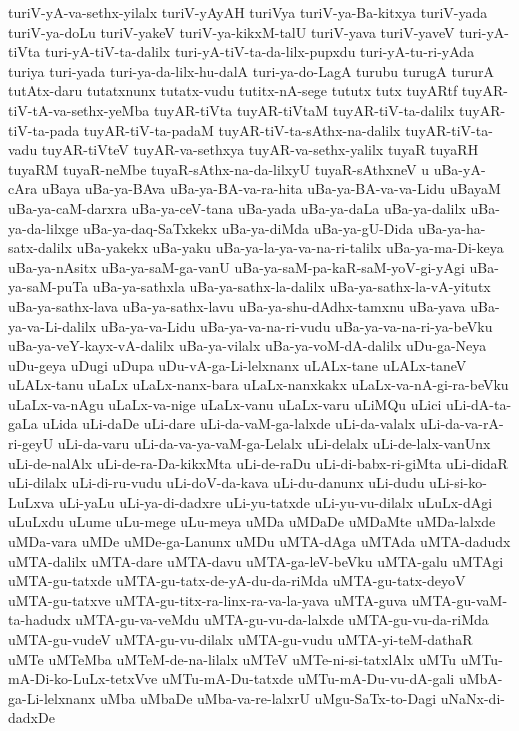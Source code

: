 {turiV-yA-va-sethx-yilalx
turiV-yAyAH
turiVya
turiV-ya-Ba-kitxya
turiV-yada
turiV-ya-doLu
turiV-yakeV
turiV-ya-kikxM-talU
turiV-yava
turiV-yaveV
turi-yA-tiVta
turi-yA-tiV-ta-dalilx
turi-yA-tiV-ta-da-lilx-pupxdu
turi-yA-tu-ri-yAda
turiya
turi-yada
turi-ya-da-lilx-hu-dalA
turi-ya-do-LagA
turubu
turugA
tururA
tutAtx-daru
tutatxnunx
tutatx-vudu
tutitx-nA-sege
tututx
tutx
tuyARtf
tuyAR-tiV-tA-va-sethx-yeMba
tuyAR-tiVta
tuyAR-tiVtaM
tuyAR-tiV-ta-dalilx
tuyAR-tiV-ta-pada
tuyAR-tiV-ta-padaM
tuyAR-tiV-ta-sAthx-na-dalilx
tuyAR-tiV-ta-vadu
tuyAR-tiVteV
tuyAR-va-sethxya
tuyAR-va-sethx-yalilx
tuyaR
tuyaRH
tuyaRM
tuyaR-neMbe
tuyaR-sAthx-na-da-lilxyU
tuyaR-sAthxneV
u
uBa-yA-cAra
uBaya
uBa-ya-BAva
uBa-ya-BA-va-ra-hita
uBa-ya-BA-va-va-Lidu
uBayaM
uBa-ya-caM-darxra
uBa-ya-ceV-tana
uBa-yada
uBa-ya-daLa
uBa-ya-dalilx
uBa-ya-da-lilxge
uBa-ya-daq-SaTxkekx
uBa-ya-diMda
uBa-ya-gU-Dida
uBa-ya-ha-satx-dalilx
uBa-yakekx
uBa-yaku
uBa-ya-la-ya-va-na-ri-talilx
uBa-ya-ma-Di-keya
uBa-ya-nAsitx
uBa-ya-saM-ga-vanU
uBa-ya-saM-pa-kaR-saM-yoV-gi-yAgi
uBa-ya-saM-puTa
uBa-ya-sathxla
uBa-ya-sathx-la-dalilx
uBa-ya-sathx-la-vA-yitutx
uBa-ya-sathx-lava
uBa-ya-sathx-lavu
uBa-ya-shu-dAdhx-tamxnu
uBa-yava
uBa-ya-va-Li-dalilx
uBa-ya-va-Lidu
uBa-ya-va-na-ri-vudu
uBa-ya-va-na-ri-ya-beVku
uBa-ya-veY-kayx-vA-dalilx
uBa-ya-vilalx
uBa-ya-voM-dA-dalilx
uDu-ga-Neya
uDu-geya
uDugi
uDupa
uDu-vA-ga-Li-lelxnanx
uLALx-tane
uLALx-taneV
uLALx-tanu
uLaLx
uLaLx-nanx-bara
uLaLx-nanxkakx
uLaLx-va-nA-gi-ra-beVku
uLaLx-va-nAgu
uLaLx-va-nige
uLaLx-vanu
uLaLx-varu
uLiMQu
uLici
uLi-dA-ta-gaLa
uLida
uLi-daDe
uLi-dare
uLi-da-vaM-ga-lalxde
uLi-da-valalx
uLi-da-va-rA-ri-geyU
uLi-da-varu
uLi-da-va-ya-vaM-ga-Lelalx
uLi-delalx
uLi-de-lalx-vanUnx
uLi-de-nalAlx
uLi-de-ra-Da-kikxMta
uLi-de-raDu
uLi-di-babx-ri-giMta
uLi-didaR
uLi-dilalx
uLi-di-ru-vudu
uLi-doV-da-kava
uLi-du-danunx
uLi-dudu
uLi-si-ko-LuLxva
uLi-yaLu
uLi-ya-di-dadxre
uLi-yu-tatxde
uLi-yu-vu-dilalx
uLuLx-dAgi
uLuLxdu
uLume
uLu-mege
uLu-meya
uMDa
uMDaDe
uMDaMte
uMDa-lalxde
uMDa-vara
uMDe
uMDe-ga-Lanunx
uMDu
uMTA-dAga
uMTAda
uMTA-dadudx
uMTA-dalilx
uMTA-dare
uMTA-davu
uMTA-ga-leV-beVku
uMTA-galu
uMTAgi
uMTA-gu-tatxde
uMTA-gu-tatx-de-yA-du-da-riMda
uMTA-gu-tatx-deyoV
uMTA-gu-tatxve
uMTA-gu-titx-ra-linx-ra-va-la-yava
uMTA-guva
uMTA-gu-vaM-ta-hadudx
uMTA-gu-va-veMdu
uMTA-gu-vu-da-lalxde
uMTA-gu-vu-da-riMda
uMTA-gu-vudeV
uMTA-gu-vu-dilalx
uMTA-gu-vudu
uMTA-yi-teM-dathaR
uMTe
uMTeMba
uMTeM-de-na-lilalx
uMTeV
uMTe-ni-si-tatxlAlx
uMTu
uMTu-mA-Di-ko-LuLx-tetxVve
uMTu-mA-Du-tatxde
uMTu-mA-Du-vu-dA-gali
uMbA-ga-Li-lelxnanx
uMba
uMbaDe
uMba-va-re-lalxrU
uMgu-SaTx-to-Dagi
uNaNx-di-dadxDe
}

